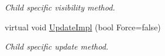\begin{DoxyCompactItemize}
\begin{DoxyCompactList}\small\item\em Child specific visibility method. \item\end{DoxyCompactList}\item 
\hypertarget{classMezzanine_1_1UI_1_1CheckBox_a1dcc1684b11c57f2c47153836ffe7c0a}{
virtual void \hyperlink{classMezzanine_1_1UI_1_1CheckBox_a1dcc1684b11c57f2c47153836ffe7c0a}{UpdateImpl} (bool Force=false)}
\label{classMezzanine_1_1UI_1_1CheckBox_a1dcc1684b11c57f2c47153836ffe7c0a}

\begin{DoxyCompactList}\small\item\em Child specific update method. \item\end{DoxyCompactList}\end{DoxyCompactItemize}
